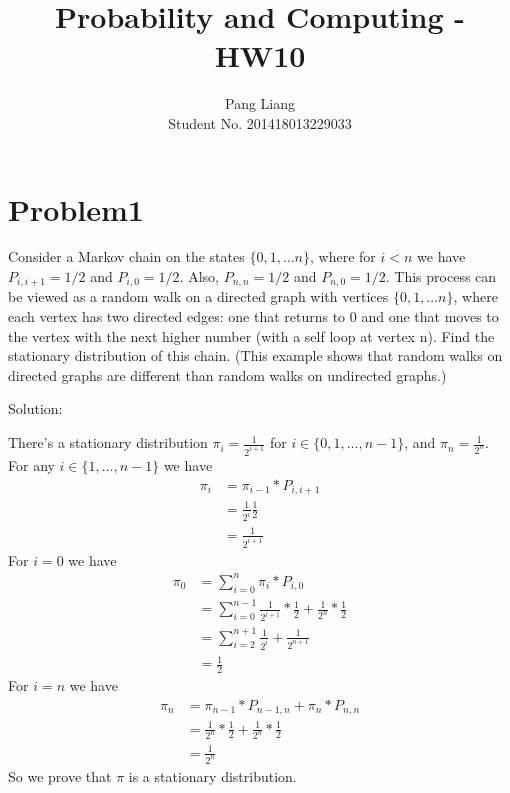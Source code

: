 \documentclass[12pt]{article}
\title{Probability and Computing - HW10}
\author{Pang Liang\\ Student No. 201418013229033}
\begin{document}
\maketitle

\section{Problem1}
Consider a Markov chain on the states $\{ 0,1,\dots n\}$, where for $i < n$ we have $P_{i,i+1} = 1/2$ and $P_{i,0} = 1/2$. Also, $P_{n,n} = 1/2$ and $P_{n,0} = 1/2$. This process can be viewed as a random walk on a directed graph with vertices $\{0, 1,\dots n \}$, where each vertex has two directed edges: one that returns to 0 and one that moves to the vertex with the next higher number (with a self loop at vertex n). Find the stationary distribution of this chain. (This example shows that random walks on directed graphs are different than random walks on undirected graphs.)

Solution:

There's a stationary distribution $\pi_i=\frac{1}{2^{i+1}}$ for $i \in \{0,1,\dots,n-1\}$, and $\pi_n=\frac{1}{2^n}$.\\
For any $i \in \{1,\dots,n-1\}$ we have
\begin{equation}
    \begin{split}
        \pi_i &= \pi_{i-1}*P_{i,i+1}\\
        &= \frac{1}{2^i}\frac{1}{2}\\
        &= \frac{1}{2^{i+1}}
    \end{split}
\end{equation}
For $i=0$ we have
\begin{equation}
    \begin{split}
        \pi_0 &= \sum_{i=0}^{n} \pi_{i}*P_{i,0}\\
        &= \sum_{i=0}^{n-1} \frac{1}{2^{i+1}}*\frac{1}{2} + \frac{1}{2^{n}}*\frac{1}{2}\\
        &= \sum_{i=2}^{n+1} \frac{1}{2^{i}} + \frac{1}{2^{n+1}}\\
        &= \frac{1}{2}
    \end{split}
\end{equation}
For $i=n$ we have
\begin{equation}
    \begin{split}
        \pi_n &= \pi_{n-1}*P_{n-1,n} + \pi_{n}*P_{n,n}\\
        &= \frac{1}{2^n}*\frac{1}{2} + \frac{1}{2^n}*\frac{1}{2}\\
        &= \frac{1}{2^{n}}
    \end{split}
\end{equation}
So we prove that $\pi$ is a stationary distribution. 
\end{document}
